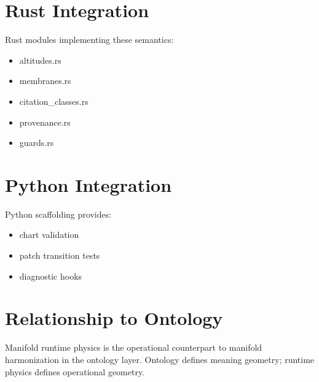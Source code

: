 \documentclass[12pt]{article}
\begin{document}
\section{Rust Integration}

Rust modules implementing these semantics:
\begin{itemize}
  \item altitudes.rs
  \item membranes.rs
  \item citation\_classes.rs
  \item provenance.rs
  \item guards.rs
\end{itemize}

\section{Python Integration}

Python scaffolding provides:
\begin{itemize}
  \item chart validation
  \item patch transition tests
  \item diagnostic hooks
\end{itemize}

\section{Relationship to Ontology}

Manifold runtime physics is the operational counterpart to manifold harmonization
in the ontology layer. Ontology defines meaning geometry; runtime physics defines
operational geometry.
\end{document}
